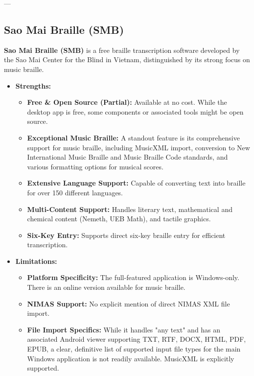 ---

\subsection{Sao Mai Braille (SMB)}
\textbf{Sao Mai Braille (SMB)} is a free braille transcription software developed by the Sao Mai Center for the Blind in Vietnam, distinguished by its strong focus on music braille.

\begin{itemize}
    \item \textbf{Strengths:}
    \begin{itemize}
        \item \textbf{Free & Open Source (Partial):} Available at no cost. While the desktop app is free, some components or associated tools might be open source.
        \item \textbf{Exceptional Music Braille:} A standout feature is its comprehensive support for music braille, including MusicXML import, conversion to New International Music Braille and Music Braille Code standards, and various formatting options for musical scores\footnotemark{}.
        \item \textbf{Extensive Language Support:} Capable of converting text into braille for over 150 different languages.
        \item \textbf{Multi-Content Support:} Handles literary text, mathematical and chemical content (Nemeth, UEB Math), and tactile graphics.
        \item \textbf{Six-Key Entry:} Supports direct six-key braille entry for efficient transcription.
    \end{itemize}
    \item \textbf{Limitations:}
    \begin{itemize}
        \item \textbf{Platform Specificity:} The full-featured application is Windows-only. There is an online version available for music braille.
        \item \textbf{NIMAS Support:} No explicit mention of direct NIMAS XML file import.
        \item \textbf{File Import Specifics:} While it handles "any text" and has an associated Android viewer supporting TXT, RTF, DOCX, HTML, PDF, EPUB, a clear, definitive list of supported input file types for the main Windows application is not readily available. MusicXML is explicitly supported.
    \end{itemize}

\end{itemize}
